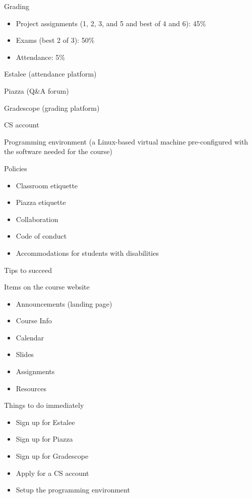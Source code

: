 \documentclass[8pt,a4paper,compress]{beamer}
\begin{document}
\begin{frame}[fragile]
\pause

Grading
\begin{itemize}
\item Project assignments (1, 2, 3, and 5 and best of 4 and 6): 45\%
\item Exams (best 2 of 3): 50\%
\item Attendance: 5\%
\end{itemize}

\pause
\bigskip

Estalee (attendance platform)

\pause
\bigskip

Piazza (Q\&A forum)

\pause
\bigskip

Gradescope (grading platform)

\pause
\bigskip

CS account

\pause
\bigskip

Programming environment (a Linux-based virtual machine pre-configured with the software needed for the course)

\pause
\bigskip

Policies
\begin{itemize}
\item Classroom etiquette
\item Piazza etiquette
\item Collaboration
\item Code of conduct
\item Accommodations for students with disabilities
\end{itemize}
\end{frame}

\begin{frame}[fragile]
\pause

Tips to succeed

\pause
\bigskip

Items on the course website
\begin{itemize}
\item Announcements (landing page)
\item Course Info
\item Calendar
\item Slides 
\item Assignments
\item Resources
\end{itemize}

\pause
\bigskip

Things to do immediately
\begin{itemize}
\item Sign up for Estalee
\item Sign up for Piazza
\item Sign up for Gradescope
\item Apply for a CS account
\item Setup the programming environment
\end{itemize}
\end{frame}
\end{document}
